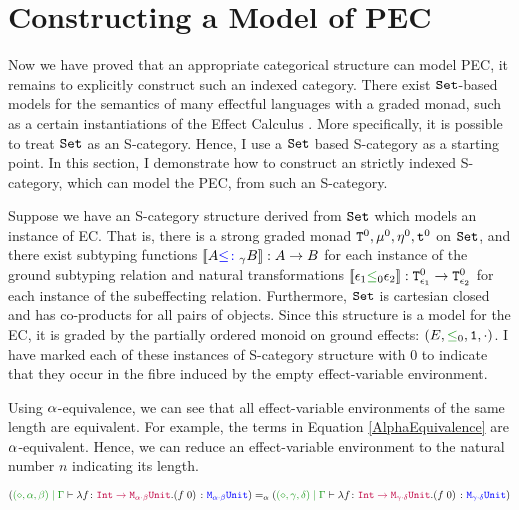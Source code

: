 
\chapter{Constructing a Model of PEC}
\label{HowToBuildAModel}

Now we have proved that an appropriate categorical structure can model PEC, it remains to explicitly construct such an indexed category. There exist $\texttt{Set}$-based models for the semantics of many effectful languages with a graded monad, such as a certain instantiations of the Effect Calculus \cite{Katsumata:2014}. More specifically, it is possible to treat $\texttt{Set}$ as an S-category. Hence, I use a $\texttt{Set}$ based S-category as a starting point. In this section, I  demonstrate how to construct an strictly indexed S-category, which can model the PEC, from such an S-category.

Suppose we have an S-category structure derived from $\texttt{Set}$ which models an instance of EC. That is, there is a strong graded monad $\texttt{T}^0_{}, \mu^0, \eta_{}^0, \texttt{t}^0$ on $\texttt{Set}$, and there exist subtyping functions ${\bf [\![}A{\color{blue} \leq\colon}_\gamma B{\bf ]\!]}: A \rightarrow B$ for each instance of the ground subtyping relation and natural transformations $\deno{\e_1 \subeffectz \e_2}: \Tz{\e_1}{} \rightarrow \Tz{\e_2}{}$ for each instance of the subeffecting relation. Furthermore, $\texttt{Set}$ is cartesian closed and has co-products for all pairs of objects. Since this structure is a model for the EC, it is graded by the partially ordered monoid on ground effects: $(E, \subeffectz, \1, \dot)$. I have marked each of these instances of S-category structure with $0$ to indicate that they occur in the fibre induced by the empty effect-variable environment.

Using $\alpha$-equivalence, we can see that all effect-variable environments of the same length are equivalent. For example, the terms in Equation \ref{AlphaEquivalence} are $\alpha$-equivalent. Hence, we can reduce an effect-variable environment to the natural number $n$ indicating its length.

\begin{equation}\label{AlphaEquivalence}
    \scalebox{.8}{$
    (\etyperelation{(\nil, \a, \b)}{\G}{\lam{f}{\fntype{\texttt{Int}}{\M{\a\dot\b}{\U}}}{(\apply{f}{0})}}{\M{\a\dot\b}{\U}})  =_\a(\etyperelation{(\nil, \g, \d)}{\G}{\lam{f}{\fntype{\texttt{Int}}{\M{\g\dot\d}{\U}}}{(\apply{f}{0})}}{\M{\g\dot\d}{\U}})
    $}
\end{equation}
 
